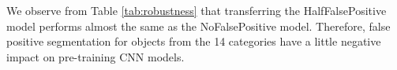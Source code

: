 We observe from Table \ref{tab:robustness} that transferring the HalfFalsePositive model performs almost the same as the NoFalsePositive model.
Therefore, false positive segmentation for objects from the 14 categories have a little negative impact on pre-training CNN models.

\begin{table}[t]
\end{table}
